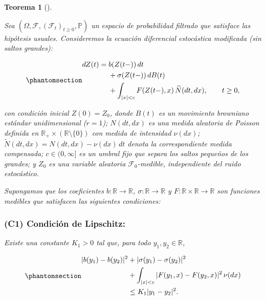 \documentclass[
  spanish,
  us-letterpaper,
]{scrreprt}
\theoremstyle{plain}
\newtheorem{theorem}{Teorema}[chapter]
\theoremstyle{plain}
\theoremstyle{plain}
\theoremstyle{definition}
\theoremstyle{remark}
\begin{document}
\begin{theorem}[]\protect\hypertarget{thm-varmues}{}\label{thm-varmues}

Sea \((\Omega, \mathcal{F}, (\mathcal{F}_t)_{t \geq 0}, \mathbb{P})\) un
espacio de probabilidad filtrado que satisface las hipótesis usuales.
Consideremos la ecuación diferencial estocástica modificada (sin saltos
grandes):

\begin{equation}\phantomsection\label{eq-sde}{
\begin{aligned}
dZ(t) ={}& b(Z(t-)) \, dt \\
         &+ \sigma(Z(t-)) \, dB(t) \\
         &+ \int_{|x| < c} F(Z(t-), x) \, \widetilde{N}(dt, dx), \qquad t \geq 0,
\end{aligned}
}\end{equation}

con condición inicial \(Z(0) = Z_0\), donde \(B(t)\) es un movimiento
browniano estándar unidimensional (\(r=1\)); \(N(dt, dx)\) es una medida
aleatoria de Poisson definida en
\(\mathbb{R}_+ \times (\mathbb{R} \setminus \{0\})\) con medida de
intensidad \(\nu(dx)\);
\(\widetilde{N}(dt, dx) = N(dt, dx) - \nu(dx)\,dt\) denota la
correspondiente medida compensada; \(c \in (0, \infty]\) es un umbral
fijo que separa los saltos pequeños de los grandes; y \(Z_0\) es una
variable aleatoria \(\mathcal{F}_0\)-medible, independiente del ruido
estocástico.

Supongamos que los coeficientes \(b: \mathbb{R} \to \mathbb{R}\),
\(\sigma: \mathbb{R} \to \mathbb{R}\) y
\(F: \mathbb{R} \times \mathbb{R} \to \mathbb{R}\) son funciones
medibles que satisfacen las siguientes condiciones:

\subsubsection{(C1) Condición de
Lipschitz:}\label{c1-condiciuxf3n-de-lipschitz}

Existe una constante \(K_1 > 0\) tal que, para todo
\(y_1, y_2 \in \mathbb{R}\),

\begin{equation}\phantomsection\label{eq-lipschitz}{
\begin{aligned}
|b(y_1) - b(y_2)|^2 & + |\sigma(y_1) - \sigma(y_2)|^2\\ 
& + \int_{|x| < c} |F(y_1, x) - F(y_2, x)|^2 \, \nu(dx) \\
&\leq K_1 |y_1 - y_2|^2.
\end{aligned}
}\end{equation}


\end{theorem}
\end{document}
